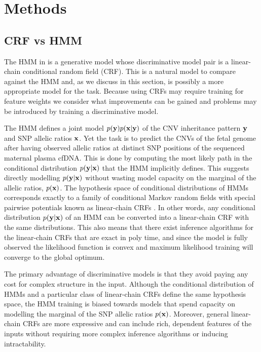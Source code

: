 \section{Methods}

\subsection{CRF vs HMM}
The HMM in \citep{rampasek2014fcnv} is a generative model whose discriminative model pair is a linear-chain conditional random field (CRF). This is a natural model to compare against the HMM and, as we discuss in this section, is possibly a more appropriate model for the task. Because using CRFs may require training for feature weights we consider what improvements can be gained and problems may be introduced by training a discriminative model.

The HMM defines a joint model $p(\mathbf{y}) p(\mathbf{x} | \mathbf{y})$ of the CNV inheritance pattern $\mathbf{y}$ and SNP allelic ratios $\mathbf{x}$. Yet the task is to predict the CNVs of the fetal genome after having observed allelic ratios at distinct SNP positions of the sequenced maternal plasma cfDNA. This is done by computing the most likely path in the conditional distribution $p(\mathbf{y} | \mathbf{x})$ that the HMM implicitly defines. This suggests directly modelling $p(\mathbf{y} | \mathbf{x})$ without wasting model capacity on the marginal of the allelic ratios, $p(\mathbf{x})$. The hypothesis space of conditional distributions of HMMs corresponds exactly to a family of conditional Markov random fields with special pairwise potentials known as linear-chain CRFs \citep{sutton2012}. In other words, any conditional distribution $p(\mathbf{y} | \mathbf{x})$ of an HMM can be converted into a linear-chain CRF with the same distributions. This also means that there exist inference algorithms for the linear-chain CRFs that are exact in poly time, and since the model is fully observed the likelihood function is convex and maximum likelihood training will converge to the global optimum.

The primary advantage of discriminative models is that they avoid paying any cost for complex structure in the input. Although the conditional distribution of HMMs and a particular class of linear-chain CRFs define the same hypothesis space, the HMM training is biased towards models that spend capacity on modelling the marginal of the SNP allelic ratios $p(\mathbf{x})$. Moreover, general linear-chain CRFs are more expressive and can include rich, dependent features of the inputs without requiring more complex inference algorithms or inducing intractability. 

